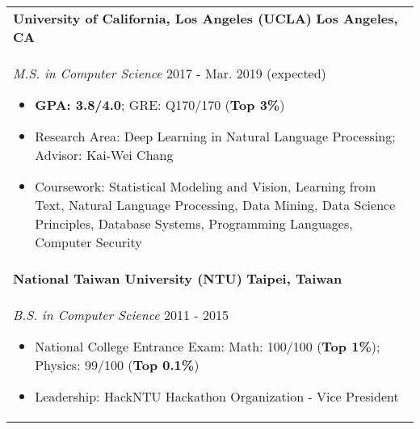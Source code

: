 \documentclass[letterpaper,11pt]{article} %
\begin{document}
{%
\begin{tabular}{p{18.5cm}}
{\bf{University of California, Los Angeles (UCLA)}}  \hfill \bf{Los Angeles, CA}\\
{\it M.S. in Computer Science} \hfill  2017 - Mar. 2019 (expected)
\begin{itemize}
\item \textbf{GPA: 3.8/4.0}; GRE: Q170/170 (\textbf{Top 3\%})
\item Research Area: Deep Learning in Natural Language Processing; Advisor: Kai-Wei Chang 
\item Coursework: Statistical Modeling and Vision, Learning from Text, Natural Language Processing, Data Mining, Data Science Principles, Database Systems, Programming Languages, Computer Security 
\vspace*{-\baselineskip}%
\end{itemize}\\ 
\vspace{.1mm}
%
{\bf{National Taiwan University (NTU)}} \hfill \bf{Taipei, Taiwan}\\
{\it B.S. in Computer Science} \hfill 2011 - 2015
\begin{itemize}
\item National College Entrance Exam:  Math: 100/100 (\textbf{Top 1\%}); Physics: 99/100 (\textbf{Top 0.1\%}) 
\item Leadership: HackNTU Hackathon Organization - Vice President 
\vspace*{-\baselineskip}
\end{itemize} 
\end{tabular}

}
\end{document}
